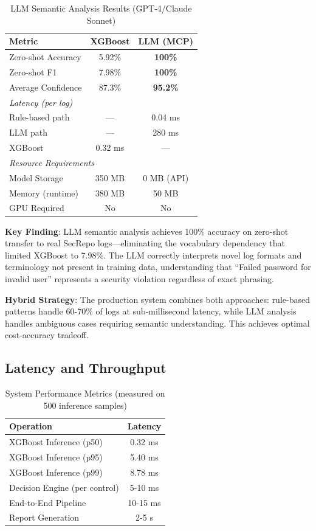 \documentclass[11pt,conference]{IEEEtran}
\begin{document}
\begin{table}[!t]
\centering
\caption{LLM Semantic Analysis Results (GPT-4/Claude Sonnet)}
\label{tab:llm_results}
\begin{tabular}{@{}lcc@{}}
\toprule
\textbf{Metric} & \textbf{XGBoost} & \textbf{LLM (MCP)} \\
\midrule
Zero-shot Accuracy & 5.92\% & \textbf{100\%} \\
Zero-shot F1 & 7.98\% & \textbf{100\%} \\
Average Confidence & 87.3\% & \textbf{95.2\%} \\
\midrule
\multicolumn{3}{l}{\textit{Latency (per log)}} \\
\quad Rule-based path & --- & 0.04 ms \\
\quad LLM path & --- & 280 ms \\
\quad XGBoost & 0.32 ms & --- \\
\midrule
\multicolumn{3}{l}{\textit{Resource Requirements}} \\
\quad Model Storage & 350 MB & 0 MB (API) \\
\quad Memory (runtime) & 380 MB & 50 MB \\
\quad GPU Required & No & No \\
\bottomrule
\end{tabular}
\end{table}

\textbf{Key Finding}: LLM semantic analysis achieves 100\% accuracy on zero-shot transfer to real SecRepo logs---eliminating the vocabulary dependency that limited XGBoost to 7.98\%. The LLM correctly interprets novel log formats and terminology not present in training data, understanding that ``Failed password for invalid user'' represents a security violation regardless of exact phrasing.

\textbf{Hybrid Strategy}: The production system combines both approaches: rule-based patterns handle 60-70\% of logs at sub-millisecond latency, while LLM analysis handles ambiguous cases requiring semantic understanding. This achieves optimal cost-accuracy tradeoff.

\subsection{Latency and Throughput}

\begin{table}[!t]
\centering
\caption{System Performance Metrics (measured on 500 inference samples)}
\label{tab:performance}
\begin{tabular}{@{}lc@{}}
\toprule
\textbf{Operation} & \textbf{Latency} \\
\midrule
XGBoost Inference (p50) & 0.32 ms \\
XGBoost Inference (p95) & 5.40 ms \\
XGBoost Inference (p99) & 8.78 ms \\
Decision Engine (per control) & 5-10 ms \\
End-to-End Pipeline & 10-15 ms \\
Report Generation & 2-5 s \\
\bottomrule
\end{tabular}
\end{table}
\end{document}
